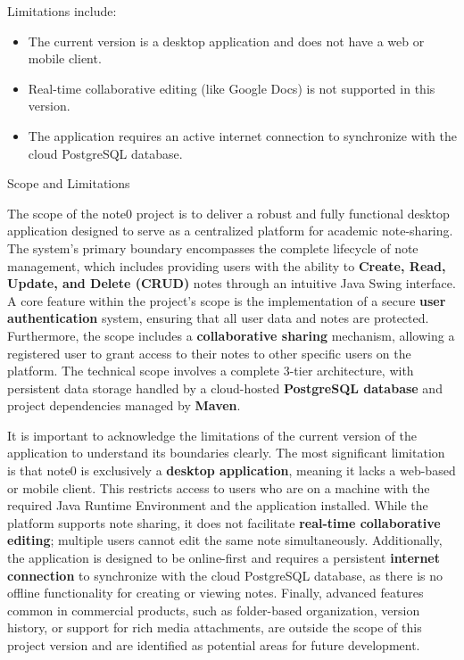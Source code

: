\documentclass[12pt, a4paper]{report}
\begin{document}
Limitations include:
\begin{itemize}
    \item The current version is a desktop application and does not have a web or mobile client.
    \item Real-time collaborative editing (like Google Docs) is not supported in this version.
    \item The application requires an active internet connection to synchronize with the cloud PostgreSQL database.
\end{itemize}

{Scope and Limitations}

The scope of the note0 project is to deliver a robust and fully functional desktop application designed to serve as a centralized platform for academic note-sharing. The system's primary boundary encompasses the complete lifecycle of note management, which includes providing users with the ability to \textbf{Create, Read, Update, and Delete (CRUD)} notes through an intuitive Java Swing interface. A core feature within the project's scope is the implementation of a secure \textbf{user authentication} system, ensuring that all user data and notes are protected. Furthermore, the scope includes a \textbf{collaborative sharing} mechanism, allowing a registered user to grant access to their notes to other specific users on the platform. The technical scope involves a complete 3-tier architecture, with persistent data storage handled by a cloud-hosted \textbf{PostgreSQL database} and project dependencies managed by \textbf{Maven}.

It is important to acknowledge the limitations of the current version of the application to understand its boundaries clearly. The most significant limitation is that note0 is exclusively a \textbf{desktop application}, meaning it lacks a web-based or mobile client. This restricts access to users who are on a machine with the required Java Runtime Environment and the application installed. While the platform supports note sharing, it does not facilitate \textbf{real-time collaborative editing}; multiple users cannot edit the same note simultaneously. Additionally, the application is designed to be online-first and requires a persistent \textbf{internet connection} to synchronize with the cloud PostgreSQL database, as there is no offline functionality for creating or viewing notes. Finally, advanced features common in commercial products, such as folder-based organization, version history, or support for rich media attachments, are outside the scope of this project version and are identified as potential areas for future development.
\end{document}
